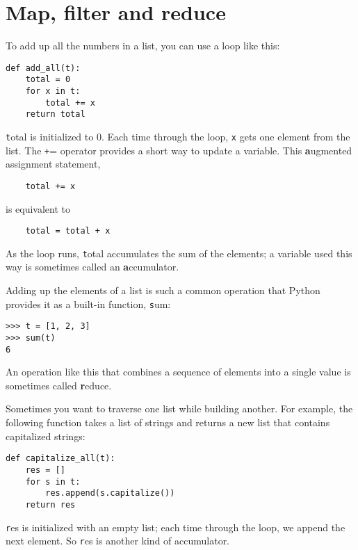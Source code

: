 \documentclass[
DIV=11,
fontsize=12,
twoside,
headinclude=false,
titlepage=firstiscover,
abstract=true,
headsepline=true,
footsepline=true,
chapterprefix=true, %
headings=big,
bibliography=totoc,%
captions=tableheading
]{scrbook}
\theoremstyle{definition}
\begin{document}
\section{Map, filter and reduce}
\label{filter}

To add up all the numbers in a list, you can use a loop like this:


\begin{lstlisting}
def add_all(t):
    total = 0
    for x in t:
        total += x
    return total
\end{lstlisting}
%
{\texttt total} is initialized to 0.  Each time through the loop,
{\texttt x} gets one element from the list.  The {\texttt +=} operator
provides a short way to update a variable.  This 
{\textbf augmented assignment statement},

\begin{lstlisting}
    total += x
\end{lstlisting}
%
is equivalent to

\begin{lstlisting}
    total = total + x
\end{lstlisting}
%
As the loop runs, {\texttt total} accumulates the sum of the
elements; a variable used this way is sometimes called an
{\textbf accumulator}.

Adding up the elements of a list is such a common operation
that Python provides it as a built-in function, {\texttt sum}:

\begin{lstlisting}
>>> t = [1, 2, 3]
>>> sum(t)
6
\end{lstlisting}
%
An operation like this that combines a sequence of elements into
a single value is sometimes called {\textbf reduce}.

Sometimes you want to traverse one list while building
another.  For example, the following function takes a list of strings
and returns a new list that contains capitalized strings:

\begin{lstlisting}
def capitalize_all(t):
    res = []
    for s in t:
        res.append(s.capitalize())
    return res
\end{lstlisting}
%
{\texttt res} is initialized with an empty list; each time through
the loop, we append the next element.  So {\texttt res} is another
kind of accumulator.
\end{document}
